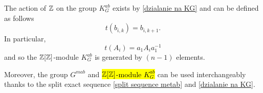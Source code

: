 The action of $\operatorname{\mathbb{Z}}$ on the group $K_G^{ab}$ exists by \cref{dzialanie na KG} and can be defined as follows 
$$t(b_{i, k})=b_{i, k+1}.$$
In particular, 
$$t(A_i)=a_1 A_i a_1^{-1}$$
and so the $\operatorname{\mathbb{Z}}[\operatorname{\mathbb{Z}}]$-module $K_G^{ab}$ is generated by $(n-1)$ elements.

Moreover, the group $G^{mab}$ and \hl{$\operatorname{\mathbb{Z}}[\operatorname{\mathbb{Z}}]$-module $K_G^{ab}$} can be used interchangeably thanks to the split exact sequence \eqref{split sequence metab} and \cref{dzialanie na KG}.

%





